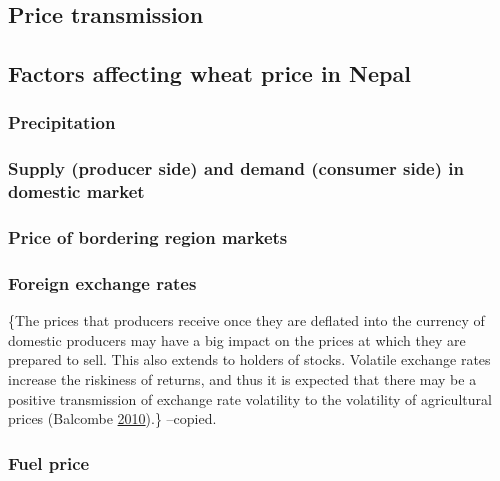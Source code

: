 \documentclass[12pt,]{article}
\begin{document}
\hypertarget{price-transmission}{%
\subsection{Price transmission}\label{price-transmission}}

\hypertarget{factors-affecting-wheat-price-in-nepal}{%
\subsection{Factors affecting wheat price in Nepal}\label{factors-affecting-wheat-price-in-nepal}}

\hypertarget{precipitation}{%
\subsubsection{Precipitation}\label{precipitation}}

\hypertarget{supply-producer-side-and-demand-consumer-side-in-domestic-market}{%
\subsubsection{Supply (producer side) and demand (consumer side) in domestic market}\label{supply-producer-side-and-demand-consumer-side-in-domestic-market}}

\hypertarget{price-of-bordering-region-markets}{%
\subsubsection{Price of bordering region markets}\label{price-of-bordering-region-markets}}

\hypertarget{foreign-exchange-rates}{%
\subsubsection{Foreign exchange rates}\label{foreign-exchange-rates}}

\{The prices that producers receive once they are deflated into the currency of domestic producers may have a big impact on the prices at which they are prepared to sell. This also extends to holders of stocks. Volatile exchange rates increase the riskiness of returns, and thus it is expected that there may be a positive transmission of exchange rate volatility to the volatility of agricultural prices (Balcombe \protect\hyperlink{ref-balcombe2010nature}{2010}).\} --copied.

\hypertarget{fuel-price}{%
\subsubsection{Fuel price}\label{fuel-price}}
\end{document}
